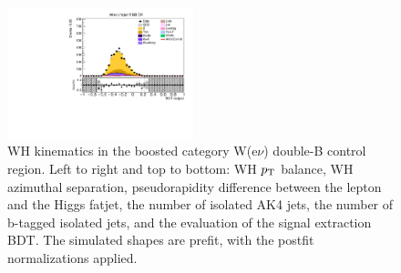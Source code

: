 \begin{figure}[tbp]
\begin{center}
    \includegraphics[width=0.48\textwidth]{figures/wlnhbb2016/boosted/WenWHTT2bFJCR_bdtValue.pdf}
    \caption{WH kinematics in the boosted category W(e$\nu$) double-B control region.
    Left to right and top to bottom: WH $p_{\mathrm{T}}$ balance, WH azimuthal separation,
    pseudorapidity difference between the lepton and the Higgs fatjet,
    the number of isolated AK4 jets, the number of b-tagged isolated jets,
    and the evaluation of the signal extraction BDT.
    The simulated shapes are prefit, with the postfit normalizations applied.}
    \label{fig:boost_WenTT2b_WH}
  \end{center}
\end{figure}
\clearpage


